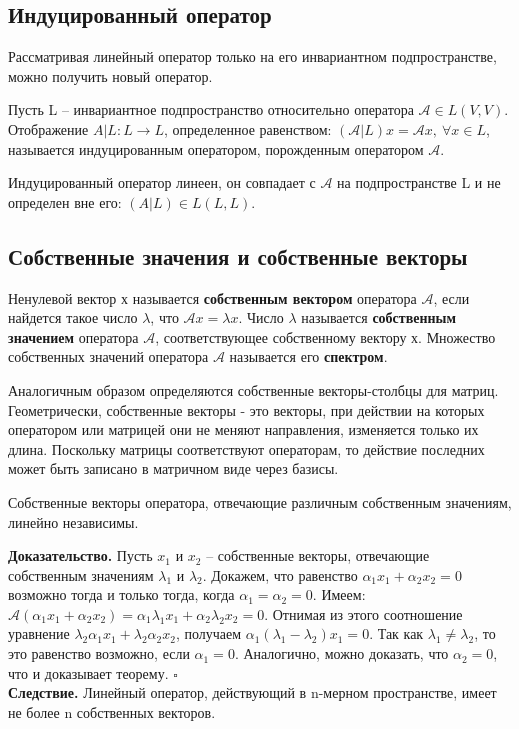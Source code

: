 \subsection{Индуцированный оператор}
Рассматривая линейный оператор только на его инвариантном подпространстве, 
можно получить новый
оператор. 
\begin{defin}
Пусть L – инвариантное подпространство относительно оператора 
$\mathcal A\in L(V,V)$. Отображение $A|L\colon L\to L$, определенное
равенством: $(\mathcal A|L)x = \mathcal Ax,~\forall x\in L$, называется
индуцированным оператором, порожденным оператором $\mathcal A$.
\end{defin}
Индуцированный оператор линеен, он совпадает с $\mathcal A$ на подпространстве
L и не определен вне его: $(A|L)\in L(L, L)$.


\subsection{Собственные значения и собственные векторы}
\begin{defin}
Ненулевой вектор х называется \textbf{собственным вектором} оператора 
$\mathcal A$, если найдется такое число $\lambda$, что $\mathcal Ax=\lambda x$.
Число
$\lambda$ называется \textbf{собственным значением} оператора $\mathcal A$,
соответствующее собственному вектору х. Множество собственных значений 
оператора $\mathcal A$ называется его \textbf{спектром}.
\end{defin}
Аналогичным образом определяются собственные векторы-столбцы для матриц. 
Геометрически, собственные векторы - это векторы, при действии на которых 
оператором или матрицей они не меняют направления, изменяется только их длина. 
Поскольку матрицы соответствуют операторам, то действие последних может 
быть записано в матричном виде через базисы.
\begin{theor}
Собственные векторы оператора, отвечающие различным собственным значениям,
линейно независимы.
\end{theor}
\textbf{Доказательство.}  Пусть $x_1$ и $x_2$ – собственные векторы, отвечающие
собственным значениям 
$\lambda_1$ и $\lambda_2$. Докажем, что равенство 
$\alpha_1x_1+\alpha_2x_2=0$ возможно тогда и только тогда, когда $\alpha_1=
\alpha_2=0$.
Имеем: $\mathcal A(\alpha_1x_1+\alpha_2x_2)=\alpha_1\lambda_1x_1+\alpha_2
\lambda_2x_2=0$.
Отнимая из этого соотношение уравнение $\lambda_2\alpha_1x_1+\lambda_2
\alpha_2x_2$, получаем $\alpha_1(\lambda_1-\lambda_2)x_1=0$.
Так как $\lambda_1\ne\lambda_2$, то это равенство возможно, если $\alpha_1=0$.
Аналогично, можно доказать, что $\alpha_2=0$,
что и доказывает теорему. $\square$\\
\textbf{Следствие.} Линейный оператор, действующий в n-мерном пространстве, 
имеет не более n собственных векторов.


